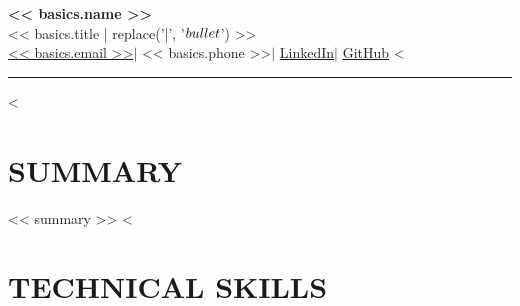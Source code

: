 \documentclass[10pt, letterpaper]{article}
\begin{document}

{\fontsize{17.6}{19.2}\selectfont\bfseries\color{navyDark} << basics.name >>} \\[1.5pt]

{\fontsize{9.5}{11.0}\selectfont\color{royalBlue}
<< basics.title | replace('|', '$\\bullet$') >>} \\[1.7pt]

{\fontsize{8.5}{10.0}\selectfont
  \href{mailto:<< basics.email >>}{\color{royalBlue}<< basics.email >>}\textcolor{pipeGray}{\hspace{4pt}$|$\hspace{4pt}}%
  \color{bodyDark}<< basics.phone >>\textcolor{pipeGray}{\hspace{4pt}$|$\hspace{4pt}}%
  \href{https://<< basics.linkedin >>}{\color{royalBlue}LinkedIn}\textcolor{pipeGray}{\hspace{4pt}$|$\hspace{4pt}}%
  \href{https://<< basics.github >>}{\color{royalBlue}GitHub}%
  <%
} \\[-4.2pt]

{\color{navyDark}\rule{\linewidth}{1.3pt}}
\vspace{-1.5pt}

<%
\section*{SUMMARY}

{\fontsize{8.7}{10.2}\selectfont\color{bodyDark}
<< summary >>
}
<%


\section*{TECHNICAL SKILLS}
\end{document}
